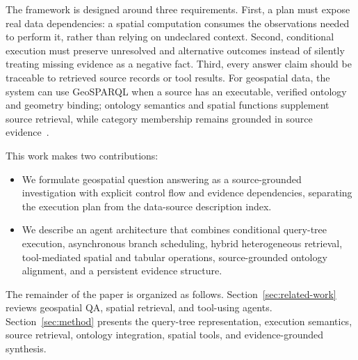 The framework is designed around three requirements. First, a plan must expose real data dependencies: a spatial computation consumes the observations needed to perform it, rather than relying on undeclared context. Second, conditional execution must preserve unresolved and alternative outcomes instead of silently treating missing evidence as a negative fact. Third, every answer claim should be traceable to retrieved source records or tool results. For geospatial data, the system can use GeoSPARQL when a source has an executable, verified ontology and geometry binding; ontology semantics and spatial functions supplement source retrieval, while category membership remains grounded in source evidence~\cite{ogc2023geosparql}.

This work makes two contributions:
\begin{itemize}
  \item We formulate geospatial question answering as a source-grounded investigation with explicit control flow and evidence dependencies, separating the execution plan from the data-source description index.
  \item We describe an agent architecture that combines conditional query-tree execution, asynchronous branch scheduling, hybrid heterogeneous retrieval, tool-mediated spatial and tabular operations, source-grounded ontology alignment, and a persistent evidence structure.
\end{itemize}

The remainder of the paper is organized as follows. Section~\ref{sec:related-work} reviews geospatial QA, spatial retrieval, and tool-using agents. Section~\ref{sec:method} presents the query-tree representation, execution semantics, source retrieval, ontology integration, spatial tools, and evidence-grounded synthesis.
